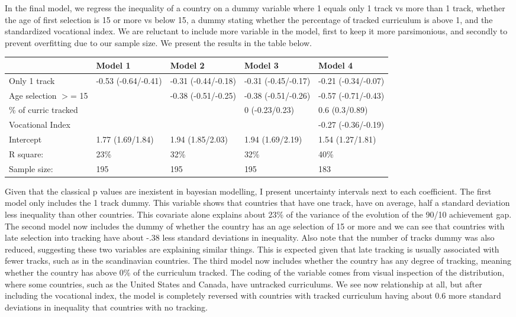 \documentclass[11pt, a4paper]{article}\usepackage[]{graphicx}\usepackage[]{color}
\begin{document}
In the final model, we regress the inequality of a country on a dummy variable where 1 equals only 1 track vs more than 1 track, whether the age of first selection is 15 or more vs below 15, a dummy stating whether the percentage of tracked curriculum is above 1, and the standardized vocational index. We are reluctant to include more variable in the model, first to keep it more parsimonious, and secondly to prevent overfitting due to our sample size. We present the results in the table below.





\begin{table}[ht]
\centering
\begin{tabular}{lllll}
  \hline
  & Model 1 & Model 2 & Model 3 & Model 4 \\ 
  \hline
Only 1 track & -0.53 (-0.64/-0.41) & -0.31 (-0.44/-0.18) & -0.31 (-0.45/-0.17) & -0.21 (-0.34/-0.07) \\ 
  Age selection $>$= 15 &  & -0.38 (-0.51/-0.25) & -0.38 (-0.51/-0.26) & -0.57 (-0.71/-0.43) \\ 
  \% of curric tracked &  &  & 0 (-0.23/0.23) & 0.6 (0.3/0.89) \\ 
  Vocational Index &  &  &  & -0.27 (-0.36/-0.19) \\ 
  Intercept & 1.77 (1.69/1.84) & 1.94 (1.85/2.03) & 1.94 (1.69/2.19) & 1.54 (1.27/1.81) \\ 
   \hline R square: & 23\% & 32\% & 32\% & 40\% \\ Sample size: & 195 & 195 & 195 & 183 \\ \hline \hline
\end{tabular}
\end{table}


Given that the classical p values are inexistent in bayesian modelling, I present uncertainty intervals next to each coefficient. The first model only includes the 1 track dummy. This variable shows that countries that have one track, have on average, half a standard deviation less inequality than other countries. This covariate alone explains about 23\% of the variance of the evolution of the 90/10 achievement gap. The second model now includes the dummy of whether the country has an age selection of 15 or more and we can see that countries with late selection into tracking have about -.38 less standard deviations in inequality. Also note that the number of tracks dummy was also reduced, suggesting these two variables are explaining similar things. This is expected given that late tracking is usually associated with fewer tracks, such as in the scandinavian countries. The third model now includes whether the country has any degree of tracking, meaning whether the country has above 0\% of the curriculum tracked. The coding of the variable comes from visual inspection of the distribution, where some countries, such as the United States and Canada, have untracked curriculums. We see now relationship at all, but after including the vocational index, the model is completely reversed with countries with tracked curriculum having about 0.6 more standard deviations in inequality that countries with no tracking.
\end{document}
